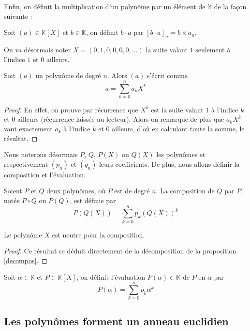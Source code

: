 Enfin, on définit la multiplication d'un polynôme par un élément de $\mathbb K$ de la façon suivante :

\begin{defi}
    Soit $(a)\in\mathbb K[X]$ et $b\in\mathbb K$, on définit $b\cdot a$ par $[b\cdot a]_n=b\times a_n$.
\end{defi}

On va désormais noter $X=(0,1,0,0,0,0,\ldots)$ la suite valant $1$ seulement à l'indice $1$ et $0$ ailleurs.

\begin{prop}\label{decompos}
    Soit $(a)$ un polynôme de degré $n$. Alors $(a)$ s'écrit comme $$a = \sum_{k=0}^n a_k X^k$$
\end{prop}

\begin{proof}
    En effet, on prouve par récurrence que $X^k$ est la suite valant $1$ à l'indice $k$ et $0$ ailleurs (récurrence laissée au lecteur). Alors on remarque de plus que $a_k X^k$ vaut exactement $a_k$ à l'indice $k$ et $0$ ailleurs, d'où en calculant toute la somme, le résultat.
\end{proof}

Nous noterons désormais $P$, $Q$, $P(X)$ ou $Q(X)$ les polynômes et respectivement $(p_n)$ et $(q_n)$ leurs coefficients. De plus, nous allons définir la composition et l'évaluation.

\begin{defi}
    Soient $P$ et $Q$ deux polynômes, où $P$ est de degré $n$. La composition de $Q$ par $P$, notée $P\circ Q$ ou $P(Q)$, est définie par $$P(Q(X))=\sum_{k=0}^n p_k (Q(X))^k$$
\end{defi}

\begin{prop}
    Le polynôme $X$ est neutre pour la composition.
\end{prop}

\begin{proof}
    Ce résultat se déduit directement de la décomposition de la proposition \ref{decompos}.
\end{proof}

\begin{defi}
    Soit $\alpha\in\mathbb K$ et $P\in\mathbb K[X]$, on définit l'évaluation $P(\alpha)\in\mathbb K$ de $P$ en $\alpha$ par $$P(\alpha)=\sum_{k=0}^n p_k \alpha^k$$
\end{defi}

\subsection{Les polynômes forment un anneau euclidien}

